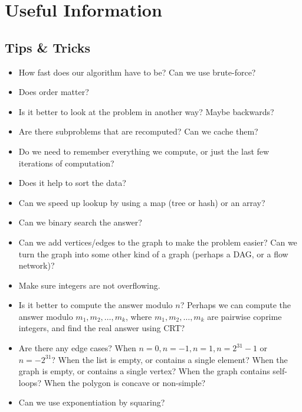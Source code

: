 \documentclass[11pt,a4paper,titlepage]{article}
\begin{document}
	\section{Useful Information}

		\subsection{Tips \&{} Tricks}
			\begin{itemize}
				\item How fast does our algorithm have to be? Can we use brute-force?
				\item Does order matter?
				\item Is it better to look at the problem in another way? Maybe backwards?
				\item Are there subproblems that are recomputed? Can we cache them?
				\item Do we need to remember everything we compute, or just the last few iterations of computation?
				\item Does it help to sort the data?
				\item Can we speed up lookup by using a map (tree or hash) or an array?
				\item Can we binary search the answer?
				\item Can we add vertices/edges to the graph to make the problem easier? Can we turn the graph into some other kind of a graph (perhaps a DAG, or a flow network)?
				\item Make sure integers are not overflowing.
				\item Is it better to compute the answer modulo $n$? Perhaps we can compute the answer modulo $m_1,m_2,\ldots,m_k$, where $m_1,m_2,\ldots,m_k$ are pairwise coprime integers, and find the real answer using CRT?
				\item Are there any edge cases? When $n=0, n=-1, n=1, n=2^{31}-1$ or $n=-2^{31}$? When the list is empty, or contains a single element? When the graph is empty, or contains a single vertex? When the graph contains self-loops?  When the polygon is concave or non-simple?
				\item Can we use exponentiation by squaring?
			\end{itemize}
\end{document}
